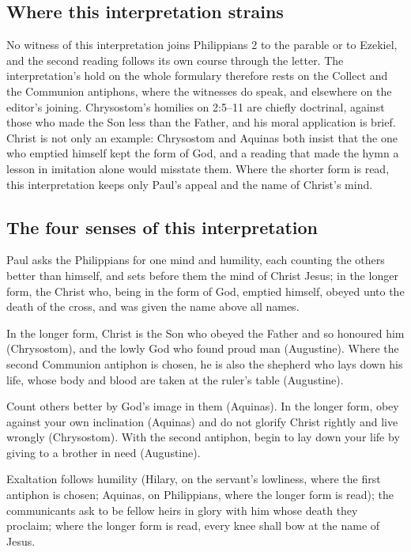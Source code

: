\subsection{Where this interpretation strains}

No witness of this interpretation joins Philippians 2 to the parable or to
Ezekiel, and the second reading follows its own course through the letter. The
interpretation's hold on the whole formulary therefore rests on the Collect
and the Communion antiphons, where the witnesses do speak, and elsewhere on the
editor's joining. Chrysostom's homilies on 2:5--11 are chiefly doctrinal,
against those who made the Son less than the Father, and his moral application
is brief. Christ is not only an example: Chrysostom and Aquinas both insist
that the one who emptied himself kept the form of God, and a reading that made
the hymn a lesson in imitation alone would misstate them. Where the shorter form
is read, this interpretation keeps only Paul's appeal and the name of Christ's
mind.

\subsection{The four senses of this interpretation}

\begin{fourSenses}
\item[Literal.] Paul asks the Philippians for one mind and humility, each
counting the others better than himself, and sets before them the mind of
Christ Jesus; in the longer form, the Christ who, being in the form of God,
emptied himself, obeyed unto the death of the cross, and was given the name
above all names.

\item[Allegorical.] In the longer form, Christ is the Son who obeyed the Father
and so honoured him (Chrysostom), and the lowly God who found proud man
(Augustine). Where the second Communion antiphon is chosen, he is also the
shepherd who lays down his life, whose body and blood are taken at the ruler's
table (Augustine).

\item[Moral.] Count others better by God's image in them (Aquinas). In the
longer form, obey against your own inclination (Aquinas) and do not glorify
Christ rightly and live wrongly (Chrysostom). With the second antiphon, begin
to lay down your life by giving to a brother in need (Augustine).

\item[Anagogical.] Exaltation follows humility (Hilary, on the servant's
lowliness, where the first antiphon is chosen; Aquinas, on Philippians, where
the longer form is read); the communicants ask to be fellow heirs in glory with
him whose death they proclaim; where the longer form is read, every knee shall
bow at the name of Jesus.
\end{fourSenses}
